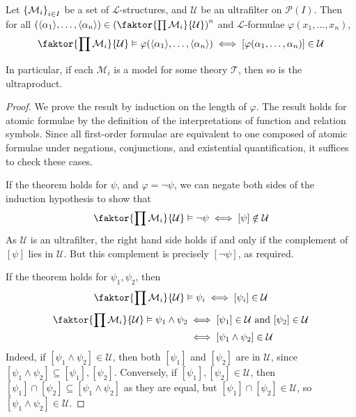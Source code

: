 \begin{theorem}
    Let \( \qty{\mathcal M_i}_{i \in I} \) be a set of \( \mathcal L \)-structures, and \( \mathcal U \) be an ultrafilter on \( \mathcal P(I) \).
    Then for all \( (\langle \alpha_1 \rangle, \dots, \langle \alpha_n \rangle) \in \qty(\faktor{\prod \mathcal M_i}{\mathcal U})^n \) and \( \mathcal L \)-formulae \( \varphi(x_1, \dots, x_n) \),
    \[ \faktor{\prod \mathcal M_i}{\mathcal U} \vDash \varphi(\langle \alpha_1 \rangle, \dots, \langle \alpha_n \rangle) \iff [\varphi(\alpha_1, \dots, \alpha_n)] \in \mathcal U \]
\end{theorem}
In particular, if each \( \mathcal M_i \) is a model for some theory \( \mathcal T \), then so is the ultraproduct.
\begin{proof}
    We prove the result by induction on the length of \( \varphi \).
    The result holds for atomic formulae by the definition of the interpretations of function and relation symbols.
    Since all first-order formulae are equivalent to one composed of atomic formulae under negations, conjunctions, and existential quantification, it suffices to check these cases.

    If the theorem holds for \( \psi \), and \( \varphi = \neg \psi \), we can negate both sides of the induction hypothesis to show that
    \[ \faktor{\prod \mathcal M_i}{\mathcal U} \vDash \neg\psi \iff [\psi] \notin \mathcal U \]
    As \( \mathcal U \) is an ultrafilter, the right hand side holds if and only if the complement of \( [\psi] \) lies in \( \mathcal U \).
    But this complement is precisely \( [\neg\psi] \), as required.

    If the theorem holds for \( \psi_1, \psi_2 \), then
    \[ \faktor{\prod \mathcal M_i}{\mathcal U} \vDash \psi_i \iff [\psi_i] \in \mathcal U \]
    \begin{align*}
        \faktor{\prod \mathcal M_i}{\mathcal U} \vDash \psi_1 \wedge \psi_2 &\iff [\psi_1] \in \mathcal U \text{ and } [\psi_2] \in \mathcal U \\
        &\iff [\psi_1 \wedge \psi_2] \in \mathcal U
    \end{align*}
    Indeed, if \( [\psi_1 \wedge \psi_2] \in \mathcal U \), then both \( [\psi_1] \) and \( [\psi_2] \) are in \( \mathcal U \), since \( [\psi_1 \wedge \psi_2] \subseteq [\psi_1], [\psi_2] \).
    Conversely, if \( [\psi_1], [\psi_2] \in \mathcal U \), then \( [\psi_1] \cap [\psi_2] \subseteq [\psi_1 \wedge \psi_2] \) as they are equal, but \( [\psi_1] \cap [\psi_2] \in \mathcal U \), so \( [\psi_1 \wedge \psi_2] \in \mathcal U \).


\end{proof}
